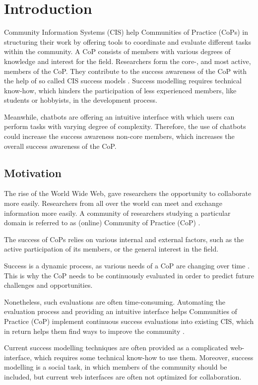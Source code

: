 \chapter{Introduction}
Community Information Systems (CIS) help Communities of Practice (CoPs) in structuring their work by offering tools to coordinate and evaluate different tasks within the community.
A CoP consists of members with various degrees of knowledge and interest for the field.
Researchers form the core-, and most active, members of the CoP.
They contribute to the success awareness of the CoP with the help of so called CIS success models \cite{Klam10c}.
Success modelling requires technical know-how, which hinders the participation of less experienced members, like students or hobbyists, in the development process.

Meanwhile, chatbots are offering an intuitive interface with which users can perform tasks with varying degree of complexity. Therefore, the use of chatbots could increase the success awareness non-core members, which increases the overall success awareness of the CoP.

\section{Motivation}
The rise of the World Wide Web, gave researchers the opportunity to collaborate more easily. Researchers from all over the world can meet and exchange information more easily. A community of researchers studying a particular domain is referred to as (online) Community of Practice (CoP) \cite{Renz08}.

The success of CoPs relies on various internal and external factors, such as the active participation of its members, or the general interest in the field.

Success is a dynamic process, as various needs of a CoP are changing over time \cite{Renz08,GKJa08}.
This is why the CoP needs to be continuously evaluated in order to predict future challenges and opportunities.

Nonetheless, such evaluations are often time-consuming. Automating the evaluation process and providing an intuitive interface helps Communities of Practice (CoP) implement continuous success evaluations into  existing CIS, which in return helps them find ways to improve the community \cite{Renz08}.

Current success modelling techniques are often provided as a complicated web-interface, which requires some technical know-how to use them.
Moreover, success modelling is a social task, in which members of the community should be included, but current web interfaces are often not optimized for collaboration.


